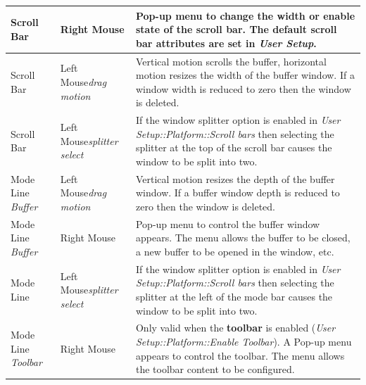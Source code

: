 \documentclass[11pt,a4paper,pdftex]{article}
\begin{document}
\begin{center}
\begin{small}
\begin{longtable}{|p{}|p{}|p{}|}
        Scroll Bar & Right Mouse &

        Pop-up menu to change the width or enable state of the scroll bar. The
        default scroll bar attributes are set in \textit{User Setup}.\\ \hline

        Scroll Bar & Left Mouse\newline \textit{drag motion} &

        Vertical motion scrolls the buffer, horizontal motion resizes the
        width of the buffer window. If a window width is reduced to zero then
        the window is deleted.\\ \hline

        Scroll Bar & Left Mouse\newline \textit{splitter select} &

        If the window splitter option is enabled in \textit{User
        Setup::\-Platform::\-Scroll bars} then selecting the splitter at the
        top of the scroll bar causes the window to be split into two.\\ \hline

        Mode Line \newline \textit{Buffer} &
        Left Mouse\newline \textit{drag motion} &

        Vertical motion resizes the depth of the buffer window. If a buffer
        window depth is reduced to zero then the window is deleted.\\ \hline

        Mode Line \newline \textit{Buffer} & Right Mouse &

        Pop-up menu to control the buffer window appears. The menu allows the
        buffer to be closed, a new buffer to be opened in the window, etc.\\
        \hline

        Mode Line & Left Mouse\newline \textit{splitter select} &

        If the window splitter option is enabled in \textit{User
        Setup::\-Platform::\-Scroll bars} then selecting the splitter at the
        left of the mode bar causes the window to be split into two.\\ \hline

        Mode Line \newline \textit{Toolbar} & Right Mouse &

        Only valid when the \textbf{toolbar} is enabled (\textit{User
        Setup::\-Platform::\-Enable Toolbar}). A Pop-up menu appears to
        control the toolbar. The menu allows the toolbar content to be
        configured.\\

      \end{longtable}
    \end{small}
  \end{center}
\end{document}
